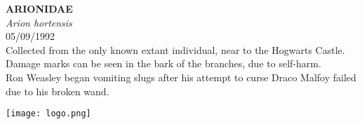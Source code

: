 \documentclass[
  landscape]{article}
\begin{document}
\begin{mdframed}[linecolor=mycolortext, linewidth=2pt, backgroundcolor=mycolor]

  \bigskip
  \begin{flushright}
  \begin{minipage}[t][-50ex][t]{16em}  
  \end{minipage}
  \end{flushright}
  \bigskip
  \begin{adjustwidth}{1cm}{1cm}
  {\fontsize{50pt}{0pt}\selectfont\bf\textcolor{mycolortext}{ ARIONIDAE }} \\
  \linebreak
  \linebreak
  {\fontsize{40pt}{100pt}\selectfont\textcolor{mycolortext}{\emph{ Arion hortensis }}} \\
  \vfill
  {\fontsize{30pt}{100pt}\selectfont\textcolor{mycolortext}{ 05/09/1992 }} \\
  \vfill
  {\fontsize{30pt}{100pt}\selectfont\textcolor{mycolortext}{ Collected from the only known extant individual, near to the Hogwarts Castle. Damage marks can be seen in the bark of the branches, due to self-harm. }} \\
  \vfill
  {\fontsize{30pt}{50pt}\selectfont\textcolor{mycolortext}{ Ron Weasley began vomiting slugs after his attempt to curse Draco Malfoy failed due to his broken wand. }} \\
  \end{adjustwidth}
  \begin{center}
  \texttt{[image: logo.png]}
  \end{center}
  \end{mdframed}
  \pagebreak

\end{document}
